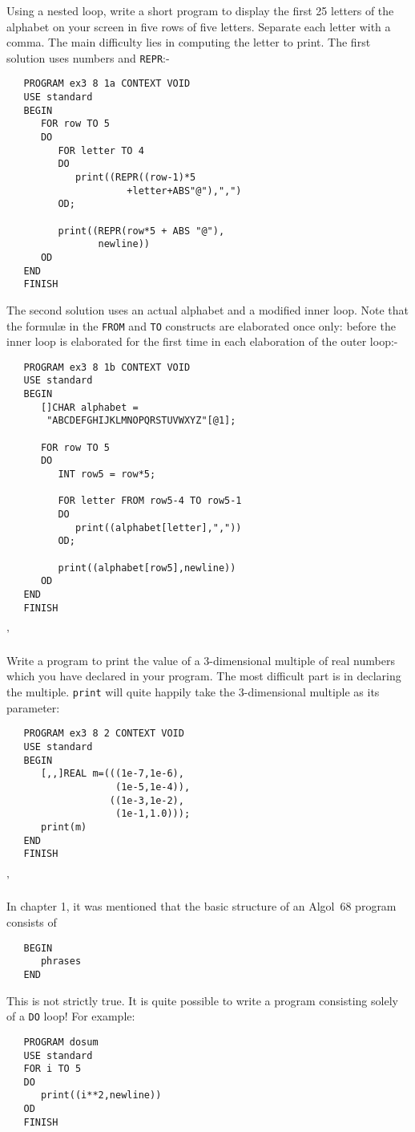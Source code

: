 \begin{exercise}
\item Using a nested loop, write a short program to display the first
25 letters of the alphabet on your screen in five rows of five
letters.  Separate each letter with a comma.
\ans The main difficulty lies in computing the letter to print. The
first solution uses numbers and \verb|REPR|:-
\begin{verbatim}
   PROGRAM ex3 8 1a CONTEXT VOID
   USE standard
   BEGIN
      FOR row TO 5
      DO
         FOR letter TO 4
         DO
            print((REPR((row-1)*5
                     +letter+ABS"@"),",")
         OD;

         print((REPR(row*5 + ABS "@"),
                newline))
      OD
   END
   FINISH
\end{verbatim}
\noindent
The second solution uses an actual alphabet and a modified inner
loop. Note that the formul\ae{} in the \verb|FROM| and \verb|TO|
constructs are elaborated once only: before the inner loop is
elaborated for the first time in each elaboration of the outer loop:-
\begin{verbatim}
   PROGRAM ex3 8 1b CONTEXT VOID
   USE standard
   BEGIN
      []CHAR alphabet =
       "ABCDEFGHIJKLMNOPQRSTUVWXYZ"[@1];

      FOR row TO 5
      DO
         INT row5 = row*5;

         FOR letter FROM row5-4 TO row5-1
         DO
            print((alphabet[letter],","))
         OD;

         print((alphabet[row5],newline))
      OD
   END
   FINISH
\end{verbatim}
'
\item Write a program to print the value of a 3-dimensional multiple
of real numbers which you have declared in your program.
\ans The most difficult part is in declaring the multiple.
\verb|print| will quite happily take the 3-dimensional multiple as
its parameter:
\begin{verbatim}
   PROGRAM ex3 8 2 CONTEXT VOID
   USE standard
   BEGIN
      [,,]REAL m=(((1e-7,1e-6),
                   (1e-5,1e-4)),
                  ((1e-3,1e-2),
                   (1e-1,1.0)));
      print(m)
   END
   FINISH
\end{verbatim}
'
\end{exercise}

In chapter 1, it was mentioned that the basic structure of an
Algol~68 program consists of
\begin{verbatim}
   BEGIN
      phrases
   END
\end{verbatim}
\noindent
This is not strictly true. It is quite possible to write a program
consisting solely of a \verb|DO| loop! For example:\pagebreak
\begin{verbatim}
   PROGRAM dosum
   USE standard
   FOR i TO 5
   DO
      print((i**2,newline))
   OD
   FINISH
\end{verbatim}

